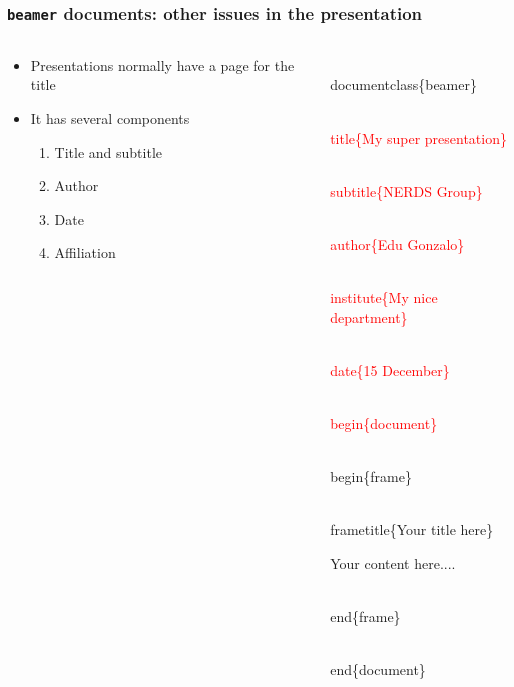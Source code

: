\documentclass[10pt]{beamer}
\newcommand{\code}{\textcolor{red}}
\begin{document}
\begin{frame}
\frametitle{\texttt{beamer} documents: other issues in the presentation}

    
   \begin{columns}
       
       
 \begin{column}{0.5\textwidth}
   \begin{itemize}
   \item Presentations normally have a page for the title
   \item It has several components 
  

       \begin{enumerate}
         \item Title and subtitle
         \item Author
         \item Date
         \item Affiliation

       \end{enumerate}
  
  
  \end{itemize}    
      
 \end{column}
 
\begin{column}{0.6\textwidth}
   
   
 \begin{semiverbatim}
   
\\documentclass\{beamer\}

\code{ \\title\{My super presentation\}}

 \code{\\subtitle\{NERDS Group\}}
 
  \code{\\author\{Edu Gonzalo\}}
  
   \code{\\institute\{My nice department\}}
 
  \code{\\date\{15 December\}}
 
\code{\\begin\{document\}}

\\begin\{frame\}

\\frametitle\{Your title here\}
 
 Your content here....

\\end\{frame\}

\\end\{document\}
  
\end{semiverbatim}

 
      
  
 \end{column}
 

       \end{columns}


\end{frame}
 
\end{document}

